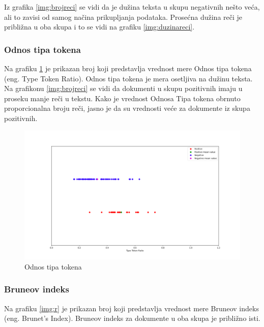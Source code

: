 \documentclass[12pt,oneside]{memoir}
\begin{document}
Iz grafika \ref{img:brojreci} se vidi da je dužina teksta u skupu negativnih nešto veća, ali to zavisi od samog načina prikupljanja podataka.  Prosećna dužina reči je približna u oba skupa i to se vidi na grafiku \ref{img:duzinareci}.

\FloatBarrier

\subsubsection{Odnos tipa tokena}

Na grafiku \ref{img:ttr} je prikazan broj koji predstavlja vrednost mere Odnos tipa tokena (eng. Type Token Ratio). Odnos tipa tokena je mera osetljiva na dužinu teksta. Na grafikonu \ref{img:brojreci} se vidi da dokumenti u skupu pozitivnih imaju u proseku manje reči u tekstu. Kako je vrednost Odnosa Tipa tokena obrnuto proporcionalna broju reči, jasno je da su vrednosti veće za dokumente iz skupa pozitivnih.

\begin{figure}[ht!]
\centering
\includegraphics[width=.9\textwidth]{images/ttr.png}
\caption{ Odnos tipa tokena }
\label{img:ttr}
\end{figure}

\FloatBarrier

\subsubsection{Bruneov indeks}

Na grafiku \ref{img:r} je prikazan broj koji predstavlja vrednost mere Bruneov indeks (eng. Brunet's Index).  Bruneov indeks za dokumente u oba skupa je približno isti.  
\end{document}
